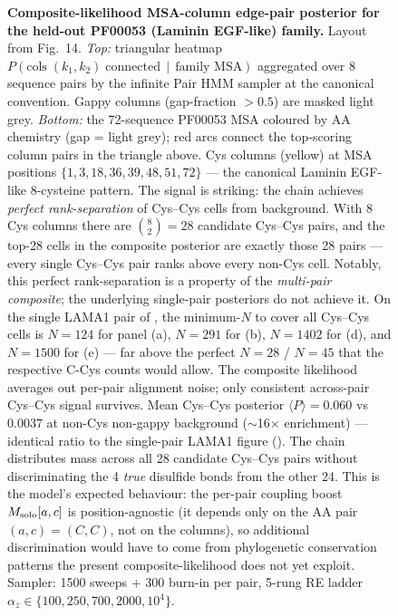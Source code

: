 \documentclass[11pt]{article}
\theoremstyle{definition}
\theoremstyle{remark}
\begin{document}
\begin{figure}[p]
\vspace*{\fill}
\caption{\textbf{Composite-likelihood MSA-column edge-pair posterior
    for the held-out PF00053 (Laminin EGF-like) family.}
    Layout from \citet{Holmes2004} Fig.~14. \emph{Top:} triangular
    heatmap $P(\text{cols}\;(k_1, k_2)\;\text{connected}\,\mid\,\text{family MSA})$
    aggregated over 8 sequence pairs by the infinite Pair HMM
    sampler at the canonical convention. Gappy columns
    (gap-fraction $> 0.5$) are masked light grey. \emph{Bottom:}
    the 72-sequence PF00053 MSA coloured by AA chemistry (gap = light
    grey); red arcs connect the top-scoring column pairs in the
    triangle above. Cys columns (yellow) at MSA positions
    $\{1, 3, 18, 36, 39, 48, 51, 72\}$ --- the canonical
    Laminin EGF-like 8-cysteine pattern.
    The signal is striking: the chain achieves
    \emph{perfect rank-separation} of Cys--Cys cells from
    background. With 8 Cys columns there are
    $\binom{8}{2} = 28$ candidate Cys--Cys pairs, and the top-28
    cells in the composite posterior are exactly those 28 pairs
    --- every single Cys--Cys pair ranks above every non-Cys cell.
    Notably, this perfect rank-separation is a property of the
    \emph{multi-pair composite}; the underlying single-pair
    posteriors do not achieve it. On the single LAMA1 pair of
    , the minimum-$N$ to cover all
    Cys--Cys cells is $N{=}124$ for panel (a),
    $N{=}291$ for (b), $N{=}1402$ for (d), and $N{=}1500$ for (e)
    --- far above the perfect $N{=}28$ / $N{=}45$ that the
    respective C-Cys counts would allow. The composite likelihood
    averages out per-pair alignment noise; only consistent
    across-pair Cys--Cys signal survives.
    Mean Cys--Cys posterior $\langle P \rangle = 0.060$ vs
    $0.0037$ at non-Cys non-gappy background
    ($\sim$16$\times$ enrichment) --- identical ratio to the
    single-pair LAMA1 figure (). The
    chain distributes mass across all 28 candidate Cys--Cys pairs
    without discriminating the 4 \emph{true} disulfide bonds from
    the other 24. This is the model's expected behaviour: the per-pair
    coupling boost $M_{\rm solo}[a, c]$ is position-agnostic
    (it depends only on the AA pair $(a, c) = (C, C)$, not on
    the columns), so additional discrimination would have to come
    from phylogenetic conservation patterns the present
    composite-likelihood does not yet exploit.
    Sampler: 1500 sweeps + 300 burn-in per pair, 5-rung RE ladder
    $\alpha_z \in \{100, 250, 700, 2000, 10^4\}$.}
\label{fig:pf00053-msa-triangle}
\vspace*{\fill}
\end{figure}
\clearpage




\end{document}
